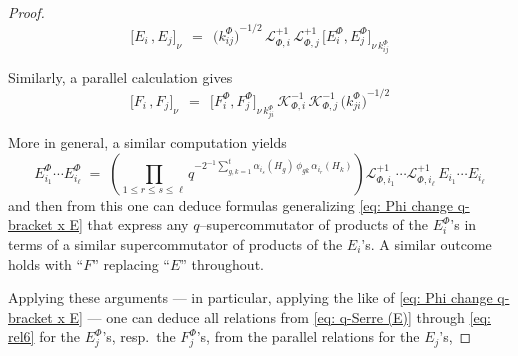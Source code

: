 \documentclass[12pt,reqno,twoside,a4paper]{amsart}
\numberwithin{equation}{section}
\theoremstyle{definition}
\newtheorem{free text}[lema]{}
\theoremstyle{remark}
\def \K {\mathcal{K}}
\def \L {\mathcal{L}}
\def \Phipicc {{\scriptscriptstyle \Phi}}
\theoremstyle{plain}
\begin{document}
\begin{proof}
%
\begin{equation}  \label{eq: Phi change q-bracket x E}
%
  {\big[ E_i \, , E_j \big]}_\nu  \,\; = \;\,  {\big( k_{i{}j}^\Phipicc \big)}^{-1/2} \, \L_{\Phipicc,i}^{+1} \, \L_{\Phipicc,j}^{+1} \, {\big[ E_i^\Phipicc , E_j^\Phipicc \big]}_{\nu \, k_{i{}j}^\Phipicc}
%
\end{equation}
%
%
                                                  \par
   Similarly, a parallel calculation gives
%
\begin{equation}  \label{eq: Phi change q-bracket x F}
%
  {\big[ F_i \, , F_j \big]}_\nu  \,\; = \;\,  {\big[ F_i^\Phipicc , F_j^\Phipicc \big]}_{\nu \, k_{j{}i}^\Phipicc} \, \K_{\Phipicc,i}^{-1} \, \K_{\Phipicc,j}^{-1} \, {\big( k_{j{}i}^\Phipicc \big)}^{-1/2}
%
\end{equation}
                                                  \par
   More in general, a similar computation yields
%
\begin{equation}  \label{eq: prod-E => prod-EPhi}
%
  E^\Phipicc_{i_1} \cdots E^\Phipicc_{i_\ell}  \; = \;
  \left({\textstyle \prod\limits_{1 \leq r \leq s \leq \ell}}
  q^{-2^{-1} \sum_{g,k=1}^t \alpha_{i_s}(H_g) \, \phi_{gk} \, \alpha_{i_r}(H_k)}\right)
  \L_{\Phipicc,i_1}^{+1} \cdots \L_{\Phipicc,i_\ell}^{+1} \,
 E_{i_1} \cdots E_{i_\ell}
%
\end{equation}
%
 and then from this one can deduce formulas generalizing  \eqref{eq: Phi change q-bracket x E}
 that express any  $ q $--supercommutator  of products of the  $ E^\Phipicc_i $'s
 in terms of a similar supercommutator of products of the  $ E_i $'s.  A similar outcome holds with  ``$ F $''  replacing  ``$ E $''  throughout.
                                                  \par
   Applying these arguments   --- in particular, applying the like of
   \eqref{eq: Phi change q-bracket x E}  ---   one can deduce all relations from
   \eqref{eq: q-Serre (E)}  through  \eqref{eq: rel6}  for the  $ E_j^\Phipicc $'s,
   resp.\ the  $ F_j^\Phipicc $'s,  from the parallel relations for the  $ E_j $'s,

\end{proof}
\end{document}
